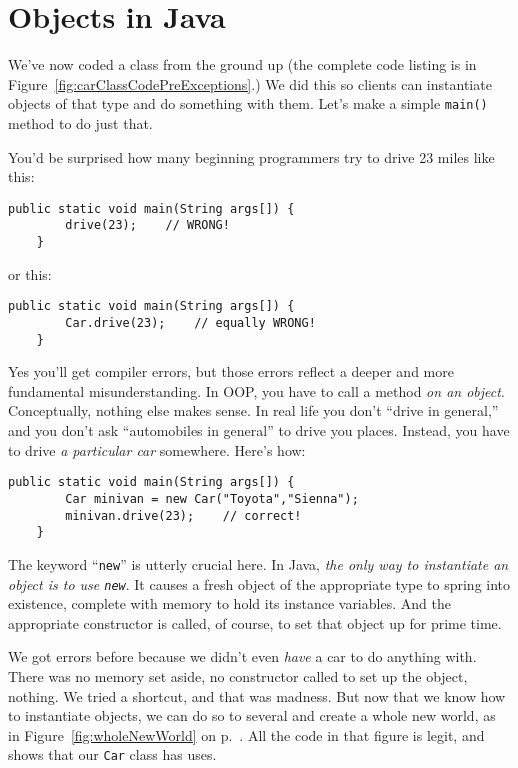 \section{Objects in Java}

We've now coded a class from the ground up (the complete code listing is in
Figure~\ref{fig:carClassCodePreExceptions}.) We did this so clients can
instantiate objects of that type and do something with them. Let's make a
simple \texttt{main()} method to do just that.

You'd be surprised how many beginning programmers try to drive 23 miles like
this:

\begin{Verbatim}[samepage=true,fontsize=\scriptsize,frame=single]
    public static void main(String args[]) {
        drive(23);    // WRONG!
    }
\end{Verbatim}

or this:

\begin{Verbatim}[samepage=true,fontsize=\scriptsize,frame=single]
    public static void main(String args[]) {
        Car.drive(23);    // equally WRONG!
    }
\end{Verbatim}

Yes you'll get compiler errors, but those errors reflect a deeper and more
fundamental misunderstanding. In OOP, you have to call a method \textit{on an
object}. Conceptually, nothing else makes sense. In real life you don't
``drive in general,'' and you don't ask ``automobiles in general'' to drive
you places. Instead, you have to drive \textit{a particular car} somewhere.
Here's how:

\begin{Verbatim}[samepage=true,fontsize=\scriptsize,frame=single]
    public static void main(String args[]) {
        Car minivan = new Car("Toyota","Sienna");
        minivan.drive(23);    // correct!
    }
\end{Verbatim}

The keyword ``\texttt{new}'' is utterly crucial here. In Java, \textit{the only
way to instantiate an object is to use \texttt{new}}. It causes a fresh object
of the appropriate type to spring into existence, complete with memory to hold
its instance variables. And the appropriate constructor is called, of course,
to set that object up for prime time.

We got errors before because we didn't even \textit{have} a car to do anything
with. There was no memory set aside, no constructor called to set up the
object, nothing. We tried a shortcut, and that was madness. But now that we
know how to instantiate objects, we can do so to several and create a whole
new world, as in Figure~\ref{fig:wholeNewWorld} on
p.~\pageref{fig:wholeNewWorld}. All the code in that figure is legit, and
shows that our \texttt{Car} class has uses.

